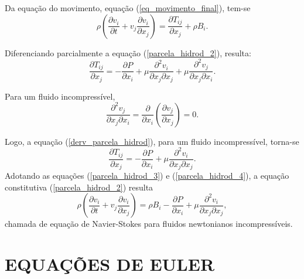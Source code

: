 Da equação do movimento, equação (\ref{eq_movimento_final}), tem-se
\begin{equation}  \label{parcela_hidrod_3}
\rho \left( \dfrac{ \partial v_{i}}{ \partial t} + v_{j} \dfrac{ \partial v_{i}}{ \partial x_{j}} \right) = \dfrac{ \partial T_{ij}}{ \partial x_{j}} + \rho B_{i}.
\end{equation}

Diferenciando parcialmente a equação (\ref{parcela_hidrod_2}), resulta:
\begin{equation} \label{derv_parcela_hidrod}
\dfrac{ \partial T_{ij}}{ \partial x_{j}} = - \dfrac{ \partial P}{ \partial x_{i}} + \mu \dfrac{ \partial ^{2} v_{i}}{ \partial x_{j} \partial x_{j}} + \mu \dfrac{ \partial ^{2} v_{j}}{ \partial x_{j} \partial x_{i}}.
\end{equation}

Para um fluido incompressível, 
\begin{equation}
\dfrac{ \partial ^{2} v_{j}}{ \partial x_{j} \partial x_{i}} = \dfrac{ \partial}{ \partial x_{i}} \left( \dfrac{ \partial v_{j}}{ \partial x_{j}} \right) = 0.
\end{equation}

Logo, a equação (\ref{derv_parcela_hidrod}), para um fluido incompressível, torna-se
\begin{equation}  \label{parcela_hidrod_4}
\dfrac{ \partial T_{ij}}{ \partial x_{j}} = - \dfrac{ \partial P}{ \partial x_{i}} + \mu \dfrac{ \partial ^{2} v_{i}}{ \partial x_{j} \partial x_{j}}.
\end{equation}
Adotando as equações (\ref{parcela_hidrod_3}) e (\ref{parcela_hidrod_4}), a equação constitutiva (\ref{parcela_hidrod_2}) resulta
\begin{equation} \label{Navier_Stokes}
\rho \left( \dfrac{ \partial v_{i}}{ \partial t} + v_{j} \dfrac{ \partial v_{i}}{ \partial x_{j}} \right) = \rho B_{i}  - \dfrac{ \partial P}{ \partial x_{i}} + \mu \dfrac{ \partial ^{2} v_{i}}{ \partial x_{j} \partial x_{j}}, 
\end{equation}
chamada de equação de Navier-Stokes para fluidos newtonianos incompressíveis.

\section{EQUAÇÕES DE EULER} \label{Euler}

